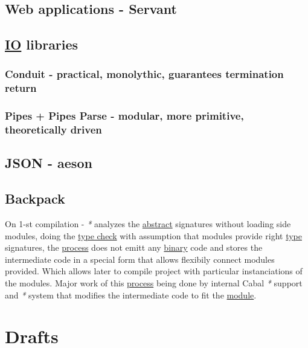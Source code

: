 \documentclass[a4paper,14pt,oneside]{book}
\begin{document}
\chapter{Web applications - Servant}
\label{sec:orge6d75d4}

\chapter{\hyperref[org6cc4576]{IO} libraries}
\label{sec:org11da83f}

\section{Conduit - practical, monolythic, guarantees termination return}
\label{sec:orge0bc5c5}

\section{Pipes + Pipes Parse - modular, more primitive, theoretically driven}
\label{sec:org4f81aae}

\chapter{JSON - aeson}
\label{sec:org3c4c02a}

\chapter{\label{org49d8179}Backpack}
\label{sec:orgd9d7700}
On 1-st compilation - \emph{*} analyzes the \hyperref[org6305688]{abstract} signatures without loading side modules, doing the \hyperref[orgc33d1a5]{type check} with assumption that modules provide right \hyperref[org5572de7]{type} signatures, the \hyperref[org0b8efa8]{process} does not emitt any \hyperref[orgcda6d0d]{binary} code and stores the intermediate code in a special form that allows flexibily connect modules provided. Which allows later to compile project with particular instanciations of the modules. Major work of this \hyperref[org0b8efa8]{process} being done by internal Cabal \emph{*} support and \emph{*} system that modifies the intermediate code to fit the \hyperref[org173a222]{module}.\\

\part{Drafts}
\label{sec:orgfe8056b}
\end{document}

